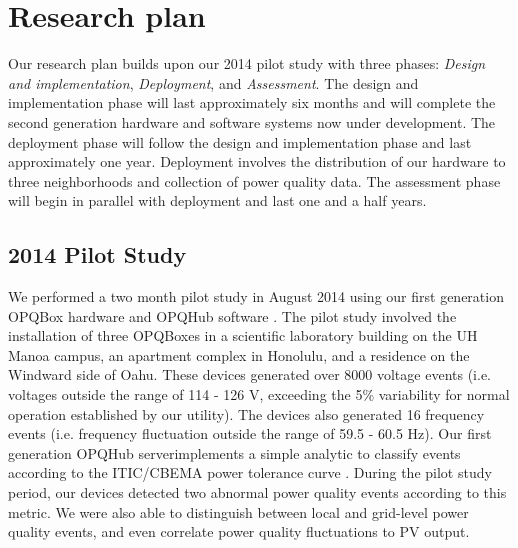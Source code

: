 
\section{Research plan}


Our research plan builds upon our 2014 pilot study with three phases: {\em Design and implementation}, {\em Deployment}, and {\em Assessment}.  The design and implementation phase will last approximately six months and will complete the second generation hardware and software systems now under development. The deployment phase will follow the design and implementation phase and last approximately one year. Deployment involves the distribution of our hardware to three neighborhoods and collection of power quality data.  The assessment phase will begin in parallel with deployment and last one and a half years. 

\subsection{2014 Pilot Study}

We performed a two month pilot study in August 2014 using our first generation OPQBox hardware and OPQHub software \cite{g1-pilot-study}. The pilot study involved the installation of three OPQBoxes in a scientific laboratory building on the UH Manoa campus, an apartment complex in Honolulu, and a residence on the Windward side of Oahu. These devices generated over 8000 voltage events (i.e. voltages outside the range of 114 - 126 V, exceeding the 5\% variability for normal operation established by our utility).  The devices also generated 16 frequency events (i.e. frequency fluctuation outside the range of 59.5 - 60.5 Hz). Our first generation OPQHub serverimplements a simple analytic to classify events according to the ITIC/CBEMA power tolerance curve \cite{ITIC}. During the pilot study period, our devices detected two abnormal power quality events according to this metric. We were also able to distinguish between local and grid-level power quality events, and even correlate power quality fluctuations to PV output.

